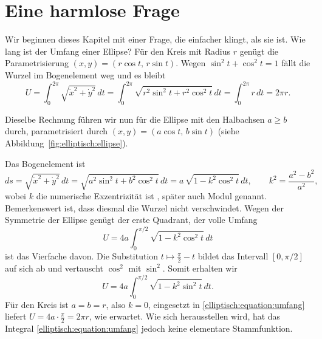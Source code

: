 %
%
%
%
\section{Eine harmlose Frage
\label{elliptisch:section:einleitung}}

Wir beginnen dieses Kapitel mit einer Frage, die einfacher klingt,
als sie ist.
Wie lang ist der Umfang einer Ellipse?
Für den Kreis mit Radius $r$ genügt die Parametrisierung
$(x,y) = (r\cos t,\, r\sin t)$.
Wegen $\sin^2 t + \cos^2 t = 1$ fällt die Wurzel im Bogenelement weg
und es bleibt
\begin{equation}
U
=
\int_0^{2\pi} \sqrt{\dot x^2 + \dot y^2}\,dt
=
\int_0^{2\pi} \sqrt{r^2\sin^2 t + r^2\cos^2 t}\,dt
=
\int_0^{2\pi} r\,dt
=
2\pi r.
\label{elliptisch:equation:kreisumfang}
\end{equation}

Dieselbe Rechnung führen wir nun für die Ellipse mit den Halbachsen
$a \ge b$ durch, parametrisiert durch
$(x,y) = (a\cos t,\, b\sin t)$
(siehe Abbildung~\ref{fig:elliptisch:ellipse}).

Das Bogenelement ist
\begin{equation}
ds
=
\sqrt{\dot x^2 + \dot y^2}\,dt
=
\sqrt{a^2\sin^2 t + b^2\cos^2 t}\,dt
=
a\,\sqrt{1 - k^2\cos^2 t}\,dt,
\qquad
k^2 = \frac{a^2-b^2}{a^2},
\label{elliptisch:equation:bogenelement}
\end{equation}
wobei $k$ die numerische Exzentrizität ist
\cite{elliptisch:mueller-spezielle}, später auch Modul
genannt.
%
%
Bemerkenswert ist, dass diesmal die Wurzel nicht verschwindet.
Wegen der Symmetrie der Ellipse genügt der erste Quadrant, der
volle Umfang
\begin{equation}
U
=
4a \int_0^{\pi/2} \sqrt{1 - k^2\cos^2 t}\,dt
\label{elliptisch:equation:umfangcos}
\end{equation}
ist das Vierfache davon.
Die Substitution $t \mapsto \frac{\pi}{2} - t$ bildet das Intervall
$[0, \pi/2]$ auf sich ab und vertauscht $\cos^2$ mit $\sin^2$.
Somit erhalten wir
\begin{equation}
U
=
4a \int_0^{\pi/2} \sqrt{1 - k^2\sin^2 t}\,dt.
\label{elliptisch:equation:umfang}
\end{equation}
Für den Kreis ist $a = b = r$, also $k = 0$, eingesetzt in
\eqref{elliptisch:equation:umfang} liefert
$U = 4a \cdot \frac{\pi}{2} = 2\pi r$, wie erwartet.
Wie sich herausstellen wird, hat das Integral
\eqref{elliptisch:equation:umfang} jedoch keine elementare Stammfunktion.


